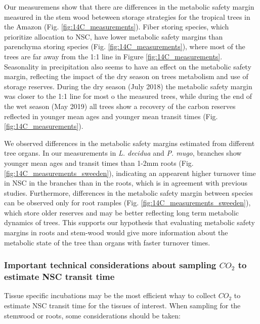 \documentclass{article}
\begin{document}
Our measuremens show that there are differences in the metabolic safety margin measured in the stem wood beteween storage strategies for the tropical trees in the Amazon (Fig. \ref{fig:14C_measurements}).
Fiber storing species, which prioritize allocation to NSC, have lower metabolic safety margins than parenchyma storing species (Fig. \ref{fig:14C_measurements}), where most of the trees are far away from the 1:1 line in Figure \ref{fig:14C_measurements}. 
Seasonality in precipitation also seems to have an effect on the metabolic safety margin, reflecting the impact of the dry season on trees metabolism and use of storage reserves. 
During the dry season (July 2018) the metabolic safety margin was closer to the 1:1 line for most o the measured trees, while during the end of the wet season (May 2019) all trees show a recovery of the carbon reserves reflected in younger mean ages and younger mean transit times (Fig. \ref{fig:14C_measurements}).

We observed differences in the metabolic safety margins estimated from different tree organs.
In our measurements in \textit{L. decidua} and \textit{P. mugo}, branches show younger mean ages and transit times than 1-2mm roots (Fig. \ref{fig:14C_measurements_sweeden}), indicating an appearent higher turnover time in NSC in the branches than in the roots, which is in agreement with previous studies. 
Furthermore, differences in the metabolic safety margin between species can be observed only for root ramples (Fig. \ref{fig:14C_measurements_sweeden}), which store older reserves and may be better reflecting long term metabolic dynamics of trees. 
This supports our hypothesis that evaluating metabolic safety margins in roots and stem-wood would give more information about the metabolic state of the tree than organs with faster turnover times. 


\subsubsection{Important technical considerations about sampling $CO_{2}$ to estimate NSC transit time}

Tissue specific incubations may be the most efficient whay to collect $CO_{2}$ to estimate NSC transit time for the tissues of interest. 
When sampling for the stemwood or roots, some considerations should be taken: 
\end{document}
